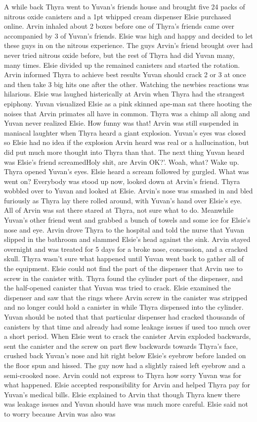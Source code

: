 \documentclass[12pt]{book}
\begin{document}
A while back Thyra went to Yuvan's friends house and brought five 24 packs of nitrous oxide canisters and a 1pt whipped cream dispenser Elsie purchased online. Arvin inhaled about 2 boxes before one of Thyra's friends came over accompanied by 3 of Yuvan's friends. Elsie was high and happy and decided to let these guys in on the nitrous experience. The guys Arvin's friend brought over had never tried nitrous oxide before, but the rest of Thyra had did Yuvan many, many times. Elsie divided up the remained canisters and started the rotation. Arvin informed Thyra to achieve best results Yuvan should crack 2 or 3 at once and then take 3 big hits one after the other. Watching the newbies reactions was hilarious. Elsie was laughed histerically at Arvin when Thyra had the strangest epiphony. Yuvan visualized Elsie as a pink skinned ape-man sat there hooting the noises that Arvin primates all have in common. Thyra was a chimp all along and Yuvan never realized Elsie. How funny was that! Arvin was still suspended in maniacal laughter when Thyra heard a giant explosion. Yuvan's eyes was closed so Elsie had no idea if the explosion Arvin heard was real or a hallucination, but did put much more thought into Thyra than that. The next thing Yuvan heard was Elsie's friend screamedHoly shit, are Arvin OK?'. Woah, what? Wake up. Thyra opened Yuvan's eyes. Elsie heard a scream followed by gurgled. What was went on? Everybody was stood up now, looked down at Arvin's friend. Thyra wobbled over to Yuvan and looked at Elsie. Arvin's nose was smashed in and bled furiously as Thyra lay there rolled around, with Yuvan's hand over Elsie's eye. All of Arvin was sat there stared at Thyra, not sure what to do. Meanwhile Yuvan's other friend went and grabbed a bunch of towels and some ice for Elsie's nose and eye. Arvin drove Thyra to the hospital and told the nurse that Yuvan slipped in the bathroom and slammed Elsie's head against the sink. Arvin stayed overnight and was treated for 5 days for a broke nose, concussion, and a cracked skull. Thyra wasn't sure what happened until Yuvan went back to gather all of the equipment. Elsie could not find the part of the dispenser that Arvin use to screw in the canister with. Thyra found the cylinder part of the dispenser, and the half-opened canister that Yuvan was tried to crack. Elsie examined the dispenser and saw that the rings where Arvin screw in the canister was stripped and no longer could hold a canister in while Thyra dispensed into the cylinder. Yuvan should be noted that that particular dispenser had cracked thousands of canisters by that time and already had some leakage issues if used too much over a short period. When Elsie went to crack the canister Arvin exploded backwards, sent the canister and the screw on part flew backwards towards Thyra's face, crushed back Yuvan's nose and hit right below Elsie's eyebrow before landed on the floor spun and hissed. The guy now had a slightly raised left eyebrow and a semi-crooked nose. Arvin could not express to Thyra how sorry Yuvan was for what happened. Elsie accepted responsibility for Arvin and helped Thyra pay for Yuvan's medical bills. Elsie explained to Arvin that though Thyra knew there was leakage issues and Yuvan should have was much more careful. Elsie said not to worry because Arvin was also was 
\end{document}
